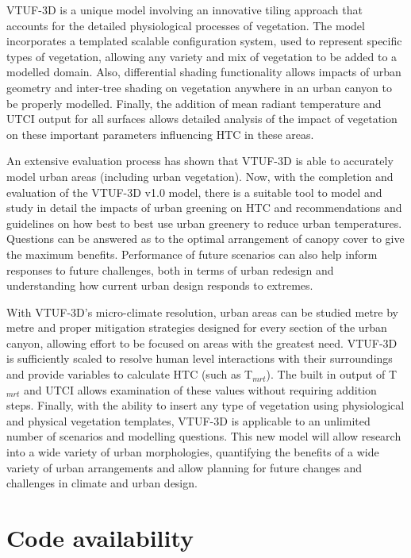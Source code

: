 \documentclass[final,3p,times,authoryear]{elsarticle}
\begin{document}
VTUF-3D is a unique model involving an innovative tiling approach that accounts for the detailed physiological processes of vegetation. The model incorporates a templated scalable configuration system, used to represent specific types of vegetation, allowing any variety and mix of vegetation to be added to a modelled domain. Also, differential shading functionality allows impacts of urban geometry and inter-tree shading on vegetation anywhere in an urban canyon to be properly modelled. Finally, the addition of mean radiant temperature and UTCI output for all surfaces allows detailed analysis of the impact of vegetation on these important parameters influencing HTC in these areas.

An extensive evaluation process has shown that VTUF-3D is able to accurately model urban areas (including urban vegetation). Now, with the completion and evaluation of the VTUF-3D v1.0 model, there is a suitable tool to model and study in detail the impacts of urban greening on HTC and recommendations and guidelines on how best to best use urban greenery to reduce urban temperatures. Questions can be answered as to the optimal arrangement of canopy cover to give the maximum benefits. Performance of future scenarios can also help inform responses to future challenges, both in terms of urban redesign and understanding how current urban design responds to extremes.

With VTUF-3D's micro-climate resolution, urban areas can be studied metre by metre and proper mitigation strategies designed for every section of the urban canyon, allowing effort to be focused on areas with the greatest need. VTUF-3D is sufficiently scaled to resolve human level interactions with their surroundings and provide variables to calculate HTC (such as T$_{mrt}$). The built in output of T$_{mrt}$ and UTCI allows examination of these values without requiring addition steps. Finally, with the ability to insert any type of vegetation using physiological and physical vegetation templates, VTUF-3D is applicable to an unlimited number of scenarios and modelling questions. This new model will allow research into a wide variety of urban morphologies, quantifying the benefits of a wide variety of urban arrangements and allow planning for future changes and challenges in climate and urban design.

\section{Code availability}\label{sec:available}
\end{document}
